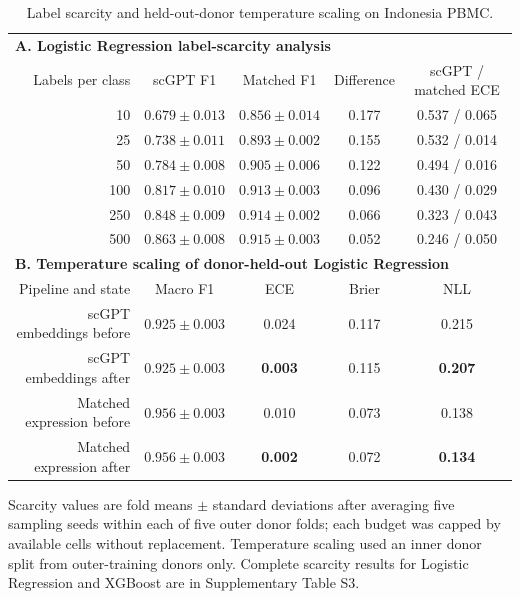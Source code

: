 \begin{table}[p]
\centering
\caption{Label scarcity and held-out-donor temperature scaling on Indonesia PBMC.}
\label{tab:secondary}
\scriptsize
\setlength{\tabcolsep}{4pt}
\begin{threeparttable}
\begin{tabular}{rcccc}
\toprule
\multicolumn{5}{l}{\textbf{A. Logistic Regression label-scarcity analysis}}\\
Labels per class & scGPT F1 & Matched F1 & Difference & scGPT / matched ECE \\
\midrule
10  & $0.679\pm0.013$ & $0.856\pm0.014$ & 0.177 & 0.537 / 0.065 \\
25  & $0.738\pm0.011$ & $0.893\pm0.002$ & 0.155 & 0.532 / 0.014 \\
50  & $0.784\pm0.008$ & $0.905\pm0.006$ & 0.122 & 0.494 / 0.016 \\
100 & $0.817\pm0.010$ & $0.913\pm0.003$ & 0.096 & 0.430 / 0.029 \\
250 & $0.848\pm0.009$ & $0.914\pm0.002$ & 0.066 & 0.323 / 0.043 \\
500 & $0.863\pm0.008$ & $0.915\pm0.003$ & 0.052 & 0.246 / 0.050 \\
\midrule
\multicolumn{5}{l}{\textbf{B. Temperature scaling of donor-held-out Logistic Regression}}\\
Pipeline and state & Macro F1 & ECE & Brier & NLL \\
\midrule
scGPT embeddings before & $0.925\pm0.003$ & 0.024 & 0.117 & 0.215 \\
scGPT embeddings after & $0.925\pm0.003$ & \textbf{0.003} & 0.115 & \textbf{0.207} \\
Matched expression before & $0.956\pm0.003$ & 0.010 & 0.073 & 0.138 \\
Matched expression after & $0.956\pm0.003$ & \textbf{0.002} & 0.072 & \textbf{0.134} \\
\bottomrule
\end{tabular}
\begin{tablenotes}[flushleft]\scriptsize
\item Scarcity values are fold means $\pm$ standard deviations after averaging five sampling seeds within each of five outer donor folds; each budget was capped by available cells without replacement. Temperature scaling used an inner donor split from outer-training donors only. Complete scarcity results for Logistic Regression and XGBoost are in Supplementary Table S3.
\end{tablenotes}
\end{threeparttable}
\end{table}
